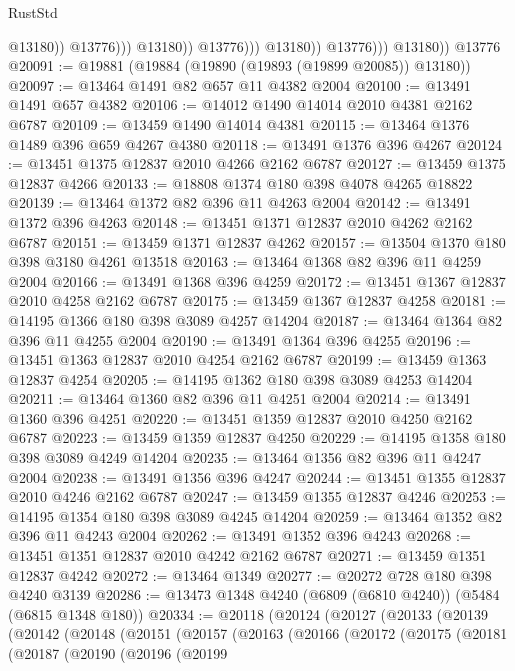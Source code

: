 \begin{lexlean}{RustStd}
\begin{coremodule}
                                      @13180))
                                  @13776)))
                            @13180))
                        @13776)))
                  @13180))
              @13776)))
        @13180))
    @13776
@20091 := @19881 (@19884 (@19890 (@19893 (@19899 @20085)) @13180))
@20097 := @13464 @1491 @82 @657 @11 @4382 @2004
@20100 := @13491 @1491 @657 @4382
@20106 := @14012 @1490 @14014 @2010 @4381 @2162 @6787
@20109 := @13459 @1490 @14014 @4381
@20115 := @13464 @1376 @1489 @396 @659 @4267 @4380
@20118 := @13491 @1376 @396 @4267
@20124 := @13451 @1375 @12837 @2010 @4266 @2162 @6787
@20127 := @13459 @1375 @12837 @4266
@20133 := @18808 @1374 @180 @398 @4078 @4265 @18822
@20139 := @13464 @1372 @82 @396 @11 @4263 @2004
@20142 := @13491 @1372 @396 @4263
@20148 := @13451 @1371 @12837 @2010 @4262 @2162 @6787
@20151 := @13459 @1371 @12837 @4262
@20157 := @13504 @1370 @180 @398 @3180 @4261 @13518
@20163 := @13464 @1368 @82 @396 @11 @4259 @2004
@20166 := @13491 @1368 @396 @4259
@20172 := @13451 @1367 @12837 @2010 @4258 @2162 @6787
@20175 := @13459 @1367 @12837 @4258
@20181 := @14195 @1366 @180 @398 @3089 @4257 @14204
@20187 := @13464 @1364 @82 @396 @11 @4255 @2004
@20190 := @13491 @1364 @396 @4255
@20196 := @13451 @1363 @12837 @2010 @4254 @2162 @6787
@20199 := @13459 @1363 @12837 @4254
@20205 := @14195 @1362 @180 @398 @3089 @4253 @14204
@20211 := @13464 @1360 @82 @396 @11 @4251 @2004
@20214 := @13491 @1360 @396 @4251
@20220 := @13451 @1359 @12837 @2010 @4250 @2162 @6787
@20223 := @13459 @1359 @12837 @4250
@20229 := @14195 @1358 @180 @398 @3089 @4249 @14204
@20235 := @13464 @1356 @82 @396 @11 @4247 @2004
@20238 := @13491 @1356 @396 @4247
@20244 := @13451 @1355 @12837 @2010 @4246 @2162 @6787
@20247 := @13459 @1355 @12837 @4246
@20253 := @14195 @1354 @180 @398 @3089 @4245 @14204
@20259 := @13464 @1352 @82 @396 @11 @4243 @2004
@20262 := @13491 @1352 @396 @4243
@20268 := @13451 @1351 @12837 @2010 @4242 @2162 @6787
@20271 := @13459 @1351 @12837 @4242
@20272 := @13464 @1349
@20277 := @20272 @728 @180 @398 @4240 @3139
@20286 := @13473 @1348 @4240 (@6809 (@6810 @4240)) (@5484 (@6815 @1348 @180))
@20334 := @20118
    (@20124
      (@20127
        (@20133
          (@20139
            (@20142
              (@20148
                (@20151
                  (@20157
                    (@20163
                      (@20166
                        (@20172
                          (@20175
                            (@20181
                              (@20187
                                (@20190
                                  (@20196
                                    (@20199

\end{coremodule}
\end{lexlean}
